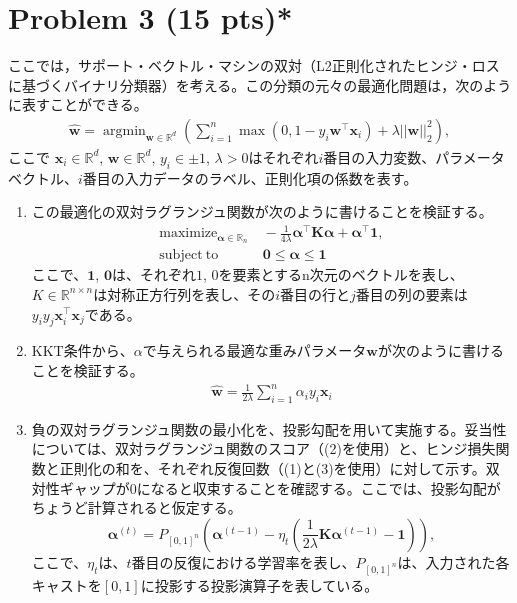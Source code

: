 \documentclass{jsarticle}
\DeclareMathOperator*{\argmin}{argmin}
\begin{document}
\section*{Problem 3 (15 pts)*}
ここでは，サポート・ベクトル・マシンの双対（L2正則化されたヒンジ・ロスに基づくバイナリ分類器）を考える。この分類の元々の最適化問題は，次のように表すことができる。
\begin{align}
  \hat{\bm w} = \argmin_{\bm w\in \mathbb R^d}\left(\sum_{i=1}^n\max(0, 1 − y_i\bm w^\top \bm x_i) + \lambda||\bm w||_2^2\right),
\end{align}
ここで $\bm x_i \in \mathbb R^d$, $\bm w \in \mathbb R^d$, $y_i \in {±1}$, $\lambda > 0$はそれぞれ$i$番目の入力変数、パラメータベクトル、$i$番目の入力データのラベル、正則化項の係数を表す。
\begin{enumerate}
  \item この最適化の双対ラグランジュ関数が次のように書けることを検証する。
  \begin{align}
    \nonumber
    \mathrm{maximize}_{ \bm\alpha\in\mathbb R_n}&\ − \frac{1}{4\lambda} \bm\alpha^\top\bm K\bm\alpha + \bm\alpha^\top\bm 1,  \\
    \mathrm{subject\ to}&\ \bm 0\le\bm\alpha\le\bm 1
  \end{align}
  ここで、$\bm 1$, $\bm 0$は、それぞれ$1$, $0$を要素とするn次元のベクトルを表し、$K \in \mathbb R^{n×n}$は対称正方行列を表し、その$i$番目の行と$j$番目の列の要素は$y_iy_j\bm x_i^\top\bm x_j$である。
  \item KKT条件から、$\alpha$で与えられる最適な重みパラメータ$\bm w$が次のように書けることを検証する。
  \begin{align}
    \hat{\bm w} = \frac{1}{2\lambda}\sum_{i=1}^n \alpha_iy_i\bm x_i
  \end{align}
  \item 負の双対ラグランジュ関数の最小化を、投影勾配を用いて実施する。妥当性については、双対ラグランジュ関数のスコア（(2)を使用）と、ヒンジ損失関数と正則化の和を、それぞれ反復回数（(1)と(3)を使用）に対して示す。双対性ギャップが0になると収束することを確認する。ここでは、投影勾配がちょうど計算されると仮定する。
  $$
  \bm\alpha^{(t)} = P_{[0,1]^n} \left(\bm\alpha^{(t−1)} − \eta_t\left(\frac{1}{2\lambda}\bm K\bm\alpha^{(t−1)} − \bm 1\right)\right),
  $$
  ここで、$\eta_t$は、$t$番目の反復における学習率を表し、$P_{[0,1]^n}$は、入力された各キャストを$[0,1]$に投影する投影演算子を表している。
\end{enumerate}
\end{document}
